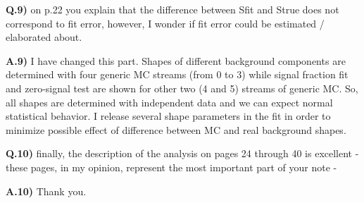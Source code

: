 \documentclass[a4paper,12pt]{article}
\begin{document}
{\bf Q.9)} on p.22 you explain that the difference between Sfit and Strue does not correspond to fit error, however, I wonder if fit error could be estimated / elaborated about. 

{\bf A.9)} I have changed this part. Shapes of different background components are determined with four generic MC streams (from 0 to 3) while signal fraction fit and zero-signal test are shown for other two (4 and 5) streams of generic MC. So, all shapes are determined with independent data and we can expect normal statistical behavior. I release several shape parameters in the fit in order to minimize possible effect of difference between MC and real background shapes.

{\bf Q.10)} finally, the description of the analysis on pages 24 through 40 is excellent - these pages, in my opinion, represent the most important part of your note -

{\bf A.10)} Thank you.
\end{document}
